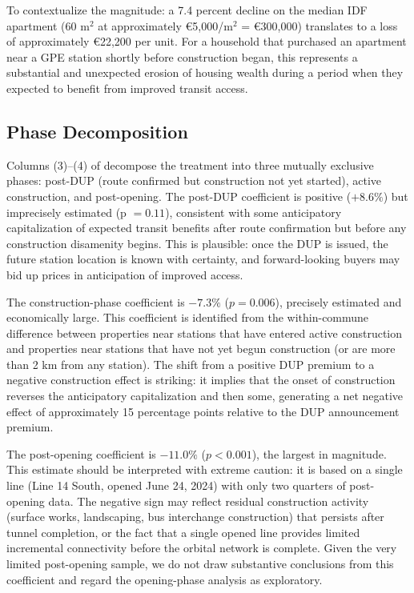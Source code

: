 \documentclass[12pt]{article}
\begin{document}
To contextualize the magnitude: a 7.4 percent decline on the median IDF apartment (60 m$^2$ at approximately \euro5,000/m$^2$ = \euro300,000) translates to a loss of approximately \euro22,200 per unit. For a household that purchased an apartment near a GPE station shortly before construction began, this represents a substantial and unexpected erosion of housing wealth during a period when they expected to benefit from improved transit access.



\subsection{Phase Decomposition}

Columns (3)--(4) of  decompose the treatment into three mutually exclusive phases: post-DUP (route confirmed but construction not yet started), active construction, and post-opening. The post-DUP coefficient is positive ($+8.6\%$) but imprecisely estimated (p $= 0.11$), consistent with some anticipatory capitalization of expected transit benefits after route confirmation but before any construction disamenity begins. This is plausible: once the DUP is issued, the future station location is known with certainty, and forward-looking buyers may bid up prices in anticipation of improved access.

The construction-phase coefficient is $-7.3\%$ ($p = 0.006$), precisely estimated and economically large. This coefficient is identified from the within-commune difference between properties near stations that have entered active construction and properties near stations that have not yet begun construction (or are more than 2 km from any station). The shift from a positive DUP premium to a negative construction effect is striking: it implies that the onset of construction reverses the anticipatory capitalization and then some, generating a net negative effect of approximately 15 percentage points relative to the DUP announcement premium.

The post-opening coefficient is $-11.0\%$ ($p < 0.001$), the largest in magnitude. This estimate should be interpreted with extreme caution: it is based on a single line (Line 14 South, opened June 24, 2024) with only two quarters of post-opening data. The negative sign may reflect residual construction activity (surface works, landscaping, bus interchange construction) that persists after tunnel completion, or the fact that a single opened line provides limited incremental connectivity before the orbital network is complete. Given the very limited post-opening sample, we do not draw substantive conclusions from this coefficient and regard the opening-phase analysis as exploratory.
\end{document}
